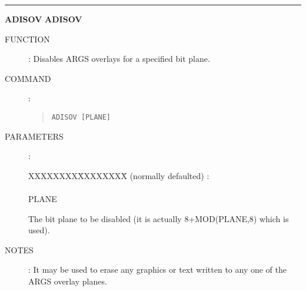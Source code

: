 \goodbreak
\rule{\textwidth}{0.3mm}
{\Large {\bf ADISOV} \hfill {\bf ADISOV}}
\begin{description}
\item [FUNCTION]:
Disables ARGS overlays for a specified bit plane.
\item [COMMAND]:
\begin{quote}
{\tt ADISOV [PLANE]}
\end{quote}
\item [PARAMETERS] :
\begin{tabbing}
XXXXXXXX\=XXXXXXXX\=\kill
(normally defaulted) :\\
\\
PLANE\>\begin{minipage}[t]{100mm}
The bit plane to be disabled (it is actually 8+MOD(PLANE,8) which is used).
\end{minipage}
\end{tabbing}
\item [NOTES]:
It may be used to erase any graphics or text written to any one of the ARGS
overlay planes.
\end{description}

